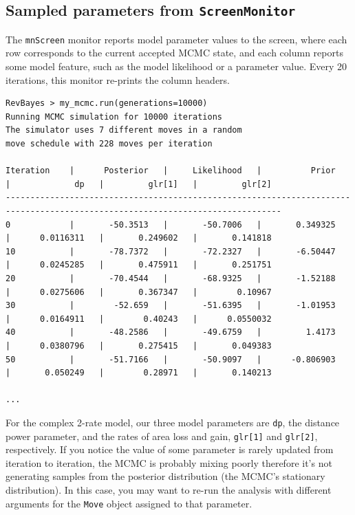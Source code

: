 \documentclass[11pt]{article}
\begin{document}
\subsection{Sampled parameters from {\tt ScreenMonitor}}

The {\tt mnScreen} monitor reports model parameter values to the screen, where each row corresponds to the current accepted MCMC state, and each column reports some model feature, such as the model likelihood or a parameter value.
Every 20 iterations, this monitor re-prints the column headers.

\begin{snugshade}
\begin{lstlisting}[basicstyle=\tiny \listingsfont, columns=texcl]
RevBayes > my_mcmc.run(generations=10000)
Running MCMC simulation for 10000 iterations
The simulator uses 7 different moves in a random
move schedule with 228 moves per iteration

Iteration    |      Posterior   |     Likelihood   |          Prior   |             dp   |         glr[1]   |         glr[2]
------------------------------------------------------------------------------------------------------------------------------
0            |       -50.3513   |       -50.7006   |       0.349325   |      0.0116311   |       0.249602   |       0.141818
10           |       -78.7372   |       -72.2327   |       -6.50447   |      0.0245285   |       0.475911   |       0.251751
20           |       -70.4544   |       -68.9325   |       -1.52188   |      0.0275606   |       0.367347   |        0.10967
30           |        -52.659   |       -51.6395   |       -1.01953   |      0.0164911   |        0.40243   |      0.0550032
40           |       -48.2586   |       -49.6759   |         1.4173   |      0.0380796   |       0.275415   |       0.049383
50           |       -51.7166   |       -50.9097   |      -0.806903   |       0.050249   |        0.28971   |       0.140213

...
\end{lstlisting}
\end{snugshade}

For the complex 2-rate model, our three model parameters are {\tt dp}, the distance power parameter, and the rates of area loss and gain, {\tt glr[1]} and {\tt glr[2]}, respectively.
If you notice the value of some parameter is rarely updated from iteration to iteration, the MCMC is probably mixing poorly therefore it's not generating samples from the posterior distribution (the MCMC's stationary distribution).
In this case, you may want to re-run the analysis with different arguments for the {\tt Move} object assigned to that parameter.
\end{document}
